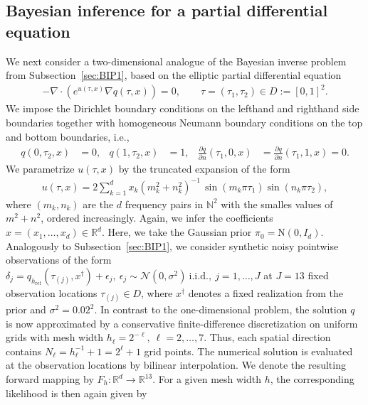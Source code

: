 \documentclass[sn-mathphys-num]{sn-jnl}%
\theoremstyle{thmstyleone}%
\theoremstyle{thmstyletwo}%
\theoremstyle{thmstylethree}%
\newcommand{\change}[1]{\bgroup\color{black}#1\egroup}    %
\begin{document}

\change{
\subsection{Bayesian inference for a partial differential equation}\label{sec:BIP2}

We next consider a two-dimensional analogue of the Bayesian inverse problem from Subsection~\ref{sec:BIP1}, based on the elliptic partial differential equation
\begin{align*}
    -\nabla \cdot \left(
    e^{u(\tau,x)} \nabla q(\tau,x)
    \right) = 0,
    \qquad \tau=(\tau_1,\tau_2)\in D:=[0,1]^2.
\end{align*}
We impose the Dirichlet boundary conditions on the lefthand and righthand side boundaries together with homogeneous Neumann boundary conditions on the top and bottom boundaries, i.e.,
\begin{align*}
    q(0,\tau_2,x) &= 0, & q(1,\tau_2,x) &= 1,
    &\frac{\partial q}{\partial n}(\tau_1,0,x)
    & =
    \frac{\partial q}{\partial n}(\tau_1,1,x)
    =0.
\end{align*}
We parametrize $u(\tau,x)$ by the truncated expansion of the form
\begin{align*}
    u(\tau,x)
    =
    2\sum_{k=1}^d
    x_k(m_k^2+n_k^2)^{-1}\,
    \sin(m_k\pi\tau_1)\sin(n_k\pi\tau_2),
\end{align*}
where $(m_k, n_k)$ are the $d$ frequency pairs in $\mathbb N^2$ with the smalles values of $m^2+n^2$, ordered increasingly. Again, we infer the coefficients $x = (x_1,\dots,x_d) \in \mathbb{R}^d$. Here, we take the Gaussian prior $\pi_0=\mathrm{N}(0,I_d)$. Analogously to Subsection~\ref{sec:BIP1}, we consider synthetic noisy pointwise observations of the form $\delta_j=q_{h_{\mathrm{ref}}}(\tau_{(j)},x^\dagger)+\epsilon_j, \ \epsilon_j\sim \mathcal N(0,\sigma^2) \ \mathrm{i.i.d.},  \ j=1,\ldots,J$ at $J=13$ fixed observation locations $\tau_{(j)} \in D$, where $x^\dagger$ denotes a fixed realization from the prior and $\sigma^2=0.02^2$. In contrast to the one-dimensional problem, the solution $q$ is now approximated by a conservative finite-difference discretization on uniform grids with mesh width $h_\ell = 2^{-\ell}, \ \ell=2,\ldots,7$. Thus, each spatial direction contains $N_\ell = h_\ell^{-1}+1 = 2^\ell+1$ grid points. The numerical solution is evaluated at the observation locations by bilinear interpolation. We denote the resulting forward mapping by $F_h:\mathbb R^d\to\mathbb R^{13}$. For a given mesh width $h$, the corresponding likelihood is then again given by
}
\end{document}
